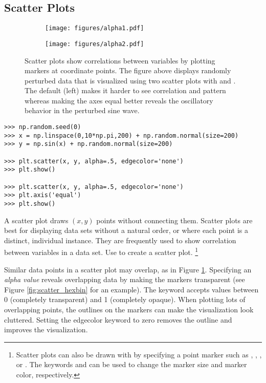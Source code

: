 \subsection*{Scatter Plots} %

\begin{figure}[H] %
    \centering
    \begin{subfigure}{.47\textwidth}
        \centering
        \texttt{[image: figures/alpha1.pdf]}
    \end{subfigure}
    \begin{subfigure}{.47\textwidth}
        \centering
        \texttt{[image: figures/alpha2.pdf]}
    \end{subfigure}
    \caption{Scatter plots show correlations between variables by plotting markers at coordinate points. The figure above displays randomly perturbed data that is visualized using two scatter plots with  and . 
The default (left) makes it harder to see correlation and pattern whereas making the axes equal better reveals the oscillatory behavior in the perturbed sine wave.}
    \label{fig:scatter_scales}
\end{figure}

\begin{lstlisting}
>>> np.random.seed(0)
>>> x = np.linspace(0,10*np.pi,200) + np.random.normal(size=200)
>>> y = np.sin(x) + np.random.normal(size=200)

>>> plt.scatter(x, y, alpha=.5, edgecolor='none')
>>> plt.show()

>>> plt.scatter(x, y, alpha=.5, edgecolor='none')
>>> plt.axis('equal')
>>> plt.show()
\end{lstlisting}

A scatter plot draws $(x,y)$ points without connecting them.
Scatter plots are best for displaying data sets without a natural order, or where each point is a distinct, individual instance.
They are frequently used to show correlation between variables in a data set.
Use  to create a scatter plot.%
\footnote{Scatter plots can also be drawn with  by specifying a point marker such as , , , or .
The keywords  and  can be used to change the marker size and marker color, respectively.}

Similar data points in a scatter plot may overlap, as in Figure \ref{fig:scatter_scales}.
Specifying an \emph{alpha value} reveals overlapping data by making the markers transparent (see Figure \ref{fig:scatter_hexbin} for an example).
The keyword  accepts values between 0 (completely transparent) and 1 (completely opaque).
When plotting lots of overlapping points, the outlines on the markers can make the visualization look cluttered.
Setting the edgecolor keyword to zero removes the outline and improves the visualization.

